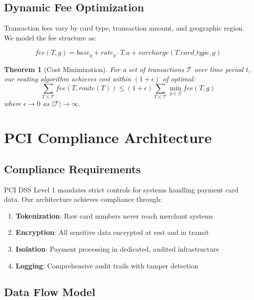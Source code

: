 \documentclass[11pt,a4paper]{article}
\newtheorem{theorem}{Theorem}[section]
\begin{document}
\subsection{Dynamic Fee Optimization}

Transaction fees vary by card type, transaction amount, and geographic region. We model the fee structure as:

\begin{equation}
fee(T, g) = base_g + rate_g \cdot T.a + surcharge(T.card\_type, g)
\end{equation}

\begin{theorem}[Cost Minimization]
For a set of transactions $\mathcal{T}$ over time period $t$, our routing algorithm achieves cost within $(1 + \epsilon)$ of optimal:
\begin{equation}
\sum_{T \in \mathcal{T}} fee(T, route(T)) \leq (1 + \epsilon) \sum_{T \in \mathcal{T}} \min_{g \in \mathcal{G}} fee(T, g)
\end{equation}
where $\epsilon \rightarrow 0$ as $|\mathcal{T}| \rightarrow \infty$.
\end{theorem}

\section{PCI Compliance Architecture}

\subsection{Compliance Requirements}

PCI DSS Level 1 mandates strict controls for systems handling payment card data. Our architecture achieves compliance through:

\begin{enumerate}
    \item \textbf{Tokenization}: Raw card numbers never reach merchant systems
    \item \textbf{Encryption}: All sensitive data encrypted at rest and in transit
    \item \textbf{Isolation}: Payment processing in dedicated, audited infrastructure
    \item \textbf{Logging}: Comprehensive audit trails with tamper detection
\end{enumerate}

\subsection{Data Flow Model}
\end{document}
